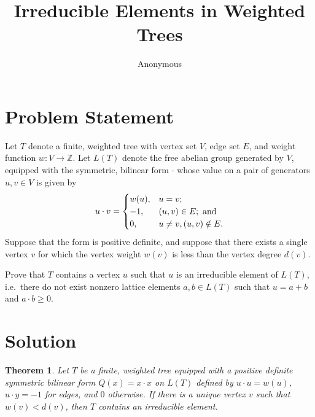 \documentclass[12pt]{article}
\title{Irreducible Elements in Weighted Trees}
\author{Anonymous}
\date{}
\newcommand{\bZ}{\mathbb{Z}}
\newtheorem{theorem}{Theorem}
\begin{document}
\maketitle

\section*{Problem Statement}

Let $T$ denote a finite, weighted tree with vertex set $V$, edge set $E$, and weight function $w : V \longrightarrow \bZ$.
Let $L(T)$ denote the free abelian group generated by $V$, equipped with the symmetric, bilinear form $\cdot$ whose value on a pair of generators $u,v \in V$ is given by 
\[
u \cdot v = 
\begin{cases}
    w(u), & u=v; \\
    -1, & (u,v) \in E; \textup{ and} \\
    0, & u \ne v, (u,v) \notin E.
\end{cases}
\]
Suppose that the form is positive definite, and suppose that there exists a single vertex $v$ for which the vertex weight $w(v)$ is less than the vertex degree $d(v)$.

Prove that $T$ contains a vertex $u$ such that $u$ is an irreducible element of $L(T)$, i.e.~there do not exist nonzero lattice elements $a,b \in L(T)$ such that $u = a+b$ and $a \cdot b \ge 0$.

\section*{Solution}

\begin{theorem}
Let $T$ be a finite, weighted tree equipped with a positive definite symmetric bilinear form $Q(x) = x \cdot x$ on $L(T)$ defined by $u \cdot u = w(u)$, $u \cdot y = -1$ for edges, and $0$ otherwise. If there is a unique vertex $v$ such that $w(v) < d(v)$, then $T$ contains an irreducible element.
\end{theorem}
\end{document}
